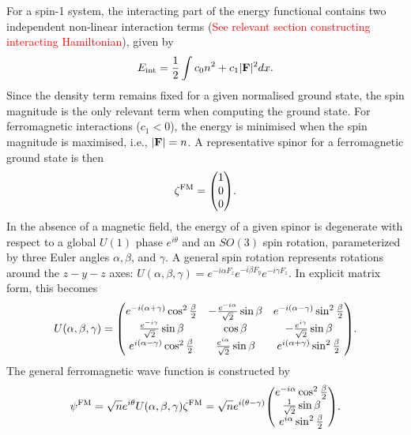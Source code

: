 For a spin-1 system, the interacting part of the energy functional contains
two independent non-linear interaction terms (\textcolor{red}{See relevant
section constructing interacting Hamiltonian}), given by
\begin{equation}
    E_\mathrm{int} = \frac{1}{2}\int c_0n^2+c_1|\vb{F}|^2 dx.
\end{equation}
Since the density term remains fixed for a given normalised ground state, the
spin magnitude is the only relevant term when computing the ground state.
For ferromagnetic interactions (\(c_1 < 0 \)), the energy is minimised when
the spin magnitude is maximised, i.e., \(|\vb{F}| = n\).
A representative spinor for a ferromagnetic ground state is then
\begin{equation}
    \zeta^\mathrm{FM} = \mqty(1 \\ 0 \\ 0).
\end{equation}
In the absence of a magnetic field, the energy of a given spinor is degenerate
with respect to a global \(U(1)\) phase \(e^{i\theta}\) and an \(SO(3)\) spin
rotation, parameterized by three Euler angles \(\alpha, \beta \),
and \(\gamma \).
A general spin rotation represents rotations around the \(z-y-z\) axes:
\(U(\alpha, \beta, \gamma) = e^{-i\alpha F_z}e^{-i\beta F_y}e^{-i\gamma F_z}\).
In explicit matrix form, this becomes
\begin{equation}
    U(\alpha, \beta, \gamma) = \mqty(
        e^{-i(\alpha + \gamma)}\cos^2\frac{\beta}{2} &
        -\frac{e^{-i\alpha}}{\sqrt{2}}\sin\beta &
        e^{-i(\alpha - \gamma)}\sin^2\frac{\beta}{2} \\
        \frac{e^{-i\gamma}}{\sqrt{2}}\sin\beta &
        \cos\beta &
        -\frac{e^{i\gamma}}{\sqrt{2}}\sin\beta \\
        e^{i(\alpha - \gamma)}\cos^2\frac{\beta}{2} &
        \frac{e^{i\alpha}}{\sqrt{2}}\sin\beta &
        e^{i(\alpha + \gamma)}\sin^2\frac{\beta}{2}
    ).
\end{equation}
The general ferromagnetic wave function is constructed by
\begin{equation}
    \psi^\mathrm{FM} = 
    \sqrt{n}e^{i\theta}U(\alpha, \beta, \gamma)\zeta^\mathrm{FM} = 
    \sqrt{n}e^{i(\theta - \gamma)}\mqty(
        e^{-i\alpha}\cos^2\frac{\beta}{2} \\
        \frac{1}{\sqrt{2}}\sin\beta \\
        e^{i\alpha}\sin^2\frac{\beta}{2}
        ).
\end{equation}

